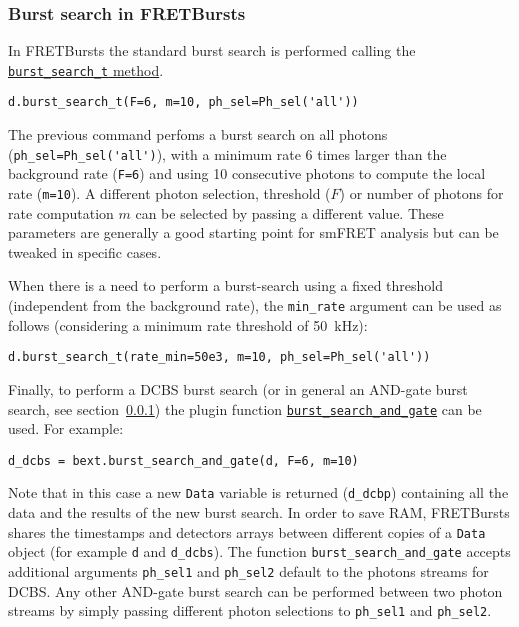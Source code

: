 \subsubsection{Burst search in FRETBursts}
\label{sec:burstsearch-intro}

In FRETBursts the standard burst search is performed calling the \href{http://fretbursts.readthedocs.org/en/latest/data_class.html#fretbursts.burstlib.Data.burst_search_t}{\verb|burst_search_t| method}.

\begin{verbatim}
d.burst_search_t(F=6, m=10, ph_sel=Ph_sel('all'))
\end{verbatim}

The previous command perfoms a burst search on all photons (\verb|ph_sel=Ph_sel('all')|), with a minimum rate 6 times larger than the background rate (\verb|F=6|) and using 10 consecutive photons to compute the local rate (\verb|m=10|).
A different photon selection, threshold ($F$) or number of photons for rate computation $m$ can be selected by passing a different value. These parameters are generally a good starting point for smFRET analysis but can be tweaked in specific cases.

When there is a need to perform a burst-search using a fixed threshold (independent from the background rate), 
the \verb|min_rate| argument can be used as follows (considering a minimum rate threshold of 50~kHz):

\begin{verbatim}
d.burst_search_t(rate_min=50e3, m=10, ph_sel=Ph_sel('all'))
\end{verbatim}

Finally, to perform a DCBS burst search (or in general an AND-gate burst search, see section~\ref{sec:burstsearch-intro}) the plugin function \href{http://fretbursts.readthedocs.org/en/latest/plugins.html#fretbursts.burstlib_ext.burst_search_and_gate}{\verb|burst_search_and_gate|} can be used. For example:

\begin{verbatim}
d_dcbs = bext.burst_search_and_gate(d, F=6, m=10)
\end{verbatim}

Note that in this case a new \verb|Data| variable is returned (\verb|d_dcbp|) containing all the data and the results of the new burst search. In order to save RAM, FRETBursts shares the timestamps and detectors arrays between different copies of a \verb|Data| object (for example \verb|d| and \verb|d_dcbs|). The function \verb|burst_search_and_gate| accepts additional arguments \verb|ph_sel1| and \verb|ph_sel2| default to the photons streams for DCBS. Any other AND-gate burst search can be performed between two photon streams by simply passing different photon selections to \verb|ph_sel1| and \verb|ph_sel2|.

